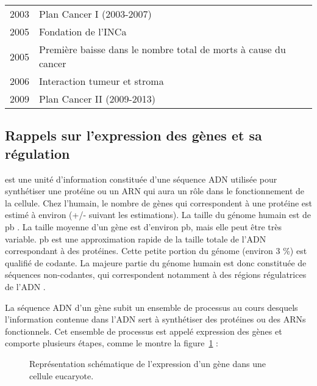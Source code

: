 \begin{table}
\begin{center}
\begin{tabular}{cl}
						2003          & Plan Cancer I (2003-2007)                                                               \\
						2005          & Fondation de l'\ac{INCa}                                                                \\
						2005          & Première baisse dans le nombre total de morts à cause du cancer                         \\
						2006          & Interaction tumeur et stroma                                                            \\
						2009          & Plan Cancer II (2009-2013)                                                              \\
						\bottomrule
					\end{tabular}
					\label{tab:Devita2012}
				\end{center}
			\end{table}

		\subsection{\textcolor{red!45!black}{Rappels sur l'expression des gènes et sa régulation}}\label{sub:RappelsExpression}
			 est une unité d'information constituée d'une séquence \acs{ADN} utilisée pour synthétiser une protéine ou un \acs{ARN} qui aura un rôle dans le fonctionnement de la cellule.
			Chez l'humain, le nombre de gènes qui correspondent à une protéine est estimé à environ  \citep{HGP2001} (+/-  suivant les estimations).
			La taille du génome humain est de  \ac{pb} \citep{HGP2001}.
			La taille moyenne d'un gène est d'environ  \ac{pb}, mais elle peut être très variable.
			 \ac{pb} est une approximation rapide de la taille totale de l'\acs{ADN} correspondant à des protéines.
			Cette petite portion du génome (environ 3 \%) est qualifié de codante.
			La majeure partie du génome humain est donc constituée de séquences non-codantes, qui correspondent notamment à des régions régulatrices de l'ADN \citep{ENCODE2012}.

			La séquence \acs{ADN} d'un gène subit un ensemble de processus au cours desquels l'information contenue dans l'\acs{ADN} sert à synthétiser des protéines ou des \acsp{ARN} fonctionnels.
			Cet ensemble de processus est appelé expression des gènes et comporte plusieurs étapes, comme le montre la figure~\ref{fig:Expression} :
			\begin{figure}
				\begin{center}
					\def\svgwidth{.8\columnwidth}
					\caption{Représentation schématique de l'expression d'un gène dans une cellule eucaryote.}
					\label{fig:Expression}
				\end{center}
			\end{figure}

